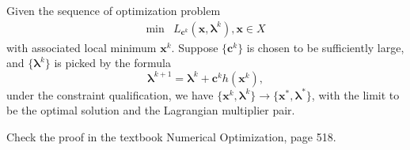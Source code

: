 \begin{theorem}
Given the sequence of optimization problem
\begin{equation}\label{Eq:10:17}
\begin{array}{ll}
\min&L_{\bm c^k}(\bm x,\bm\lambda^k),\bm x\in X
\end{array}
\end{equation}
with associated local minimum $\bm x^k$. Suppose $\{\bm c^k\}$ is chosen to be sufficiently large, and $\{\bm\lambda^k\}$ is picked by the formula
\begin{equation}
\bm\lambda^{k+1}=\bm\lambda^k+\bm c^kh(\bm x^k),
\end{equation}
under the constraint qualification, we have $\{\bm x^k,\bm\lambda^k\}\to\{\bm x^*,\bm\lambda^*\}$, with the limit to be the optimal solution and the Lagrangian multiplier pair.
\end{theorem}
Check the proof in the textbook Numerical Optimization, page 518.

















